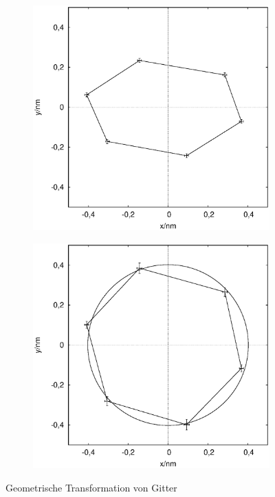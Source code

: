 \begin{figure}[h]
  \centering
  \begin{subfigure}{0.5\textwidth}
    \centering
    \includegraphics[width=1\textwidth]{data/graphit_kilian/out_rotate_old.eps}
    \label{fig:fit1}
  \end{subfigure}%
  \begin{subfigure}{0.5\textwidth}
    \centering
    \includegraphics[width=1\textwidth]{data/graphit_kilian/out_rotate.eps}
    \label{fig:fit2}
  \end{subfigure}
  \caption{Geometrische Transformation von Gitter}
\end{figure}

